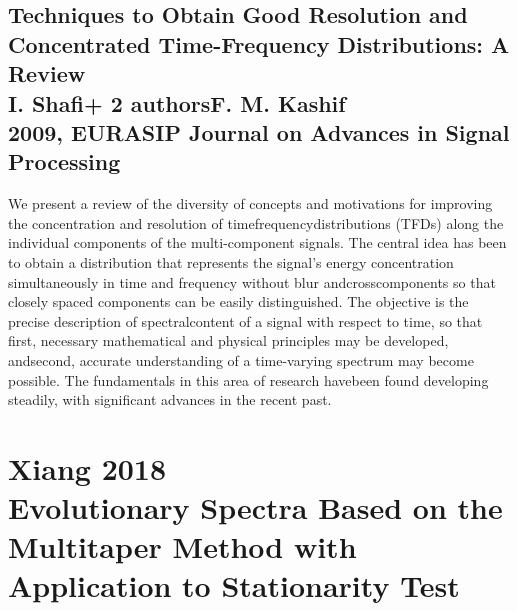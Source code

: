 \documentclass{article}
\begin{document}
\subsection{
Techniques to Obtain Good Resolution and Concentrated Time-Frequency Distributions: A Review \\
I. Shafi+ 2 authorsF. M. Kashif \\
2009, EURASIP Journal on Advances in Signal Processing}
We present a review of the diversity of concepts and motivations for improving the concentration and resolution of timefrequencydistributions (TFDs) along the individual components of the multi-component signals. The central idea has been to obtain a distribution that represents the signal’s energy concentration simultaneously in time and frequency without blur andcrosscomponents so that closely spaced components can be easily distinguished. The objective is the precise description of spectralcontent of a signal with respect to time, so that first, necessary mathematical and physical principles may be developed, andsecond, accurate understanding of a time-varying spectrum may become possible. The fundamentals in this area of research havebeen found developing steadily, with significant advances in the recent past.\\

 \newpage 
 
\section*{ Xiang 2018 \\ 
{\small Evolutionary Spectra Based on the Multitaper Method with
Application to Stationarity Test}}

\\
\end{document}
